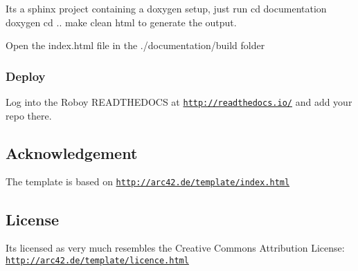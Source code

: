 Its a sphinx project containing a doxygen setup, just run cd documentation doxygen cd .. make clean html to generate the output.

Open the index.\+html file in the ./documentation/build folder

\subsubsection*{Deploy}

Log into the Roboy R\+E\+A\+D\+T\+H\+E\+D\+O\+CS at \href{http://readthedocs.io/}{\tt http\+://readthedocs.\+io/} and add your repo there.

\subsection*{Acknowledgement}

The template is based on \href{http://arc42.de/template/index.html}{\tt http\+://arc42.\+de/template/index.\+html}

\subsection*{License}

Its licensed as \textquotesingle{}very much resembles the Creative Commons Attribution License\textquotesingle{}\+: \href{http://arc42.de/template/licence.html}{\tt http\+://arc42.\+de/template/licence.\+html} 